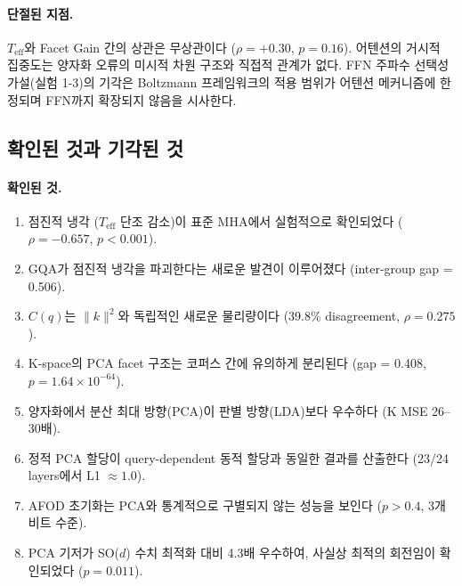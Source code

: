 \documentclass[11pt,a4paper]{article}
\begin{document}
\paragraph{단절된 지점.}
$T_\mathrm{eff}$와 Facet Gain 간의 상관은 무상관이다 ($\rho = +0.30$, $p = 0.16$).
어텐션의 거시적 집중도는 양자화 오류의 미시적 차원 구조와 직접적 관계가 없다.
FFN 주파수 선택성 가설(실험 1-3)의 기각은 Boltzmann 프레임워크의 적용 범위가 어텐션 메커니즘에 한정되며 FFN까지 확장되지 않음을 시사한다.

\subsection{확인된 것과 기각된 것}

\paragraph{확인된 것.}
\begin{enumerate}[nosep]
  \item 점진적 냉각 ($T_\mathrm{eff}$ 단조 감소)이 표준 MHA에서 실험적으로 확인되었다 ($\rho = -0.657$, $p < 0.001$).
  \item GQA가 점진적 냉각을 파괴한다는 새로운 발견이 이루어졌다 (inter-group gap = 0.506).
  \item $C(q)$는 $\|k\|^2$와 독립적인 새로운 물리량이다 (39.8\% disagreement, $\rho = 0.275$).
  \item K-space의 PCA facet 구조는 코퍼스 간에 유의하게 분리된다 (gap = 0.408, $p = 1.64 \times 10^{-64}$).
  \item 양자화에서 분산 최대 방향(PCA)이 판별 방향(LDA)보다 우수하다 (K MSE 26--30배).
  \item 정적 PCA 할당이 query-dependent 동적 할당과 동일한 결과를 산출한다 (23/24 layers에서 L1 $\approx 1.0$).
  \item AFOD 초기화는 PCA와 통계적으로 구별되지 않는 성능을 보인다 ($p > 0.4$, 3개 비트 수준).
  \item PCA 기저가 SO($d$) 수치 최적화 대비 4.3배 우수하여, 사실상 최적의 회전임이 확인되었다 ($p = 0.011$).
\end{enumerate}
\end{document}
